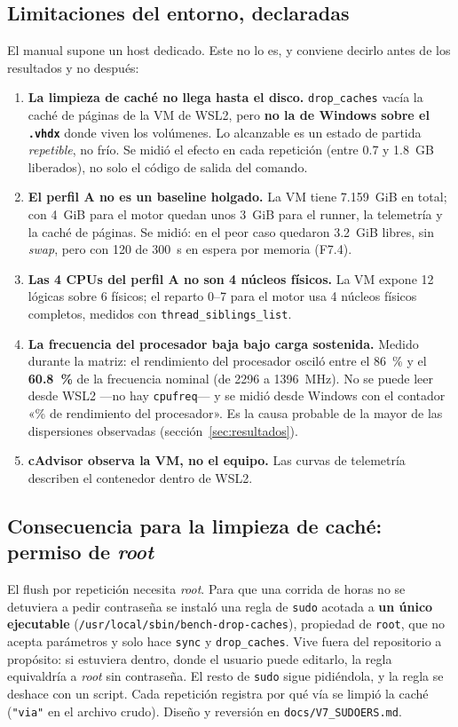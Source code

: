 \subsection{Limitaciones del entorno, declaradas}
\label{sec:limitaciones-entorno}

El manual supone un host dedicado. Este no lo es, y conviene decirlo antes de los
resultados y no después:

\begin{enumerate}
  \item \textbf{La limpieza de caché no llega hasta el disco.}
        \texttt{drop\_caches} vacía la caché de páginas de la VM de WSL2, pero
        \textbf{no la de Windows sobre el \texttt{.vhdx}} donde viven los
        volúmenes. Lo alcanzable es un estado de partida \emph{repetible}, no
        frío. Se midió el efecto en cada repetición (entre 0.7 y 1.8~GB
        liberados), no solo el código de salida del comando.
  \item \textbf{El perfil A no es un baseline holgado.} La VM tiene 7.159~GiB en
        total; con 4~GiB para el motor quedan unos 3~GiB para el runner, la
        telemetría y la caché de páginas. Se midió: en el peor caso quedaron
        3.2~GiB libres, sin \emph{swap}, pero con 120 de 300~s en espera por
        memoria (F7.4).
  \item \textbf{Las 4 CPUs del perfil A no son 4 núcleos físicos.} La VM expone 12
        lógicas sobre 6 físicos; el reparto 0--7 para el motor usa 4 núcleos
        físicos completos, medidos con \texttt{thread\_siblings\_list}.
  \item \textbf{La frecuencia del procesador baja bajo carga sostenida.} Medido
        durante la matriz: el rendimiento del procesador osciló entre el 86~\% y
        el \textbf{60.8~\%} de la frecuencia nominal (de 2296 a 1396~MHz). No se
        puede leer desde WSL2 —no hay \texttt{cpufreq}— y se midió desde Windows
        con el contador «\% de rendimiento del procesador». Es la causa probable
        de la mayor de las dispersiones observadas (sección~\ref{sec:resultados}).
  \item \textbf{cAdvisor observa la VM, no el equipo.} Las curvas de telemetría
        describen el contenedor dentro de WSL2.
\end{enumerate}

\subsection{Consecuencia para la limpieza de caché: permiso de \emph{root}}

El flush por repetición necesita \emph{root}. Para que una corrida de horas no se
detuviera a pedir contraseña se instaló una regla de \texttt{sudo} acotada a
\textbf{un único ejecutable}
(\texttt{/usr/local/sbin/\allowbreak bench-drop-caches}),
propiedad de \texttt{root}, que no acepta parámetros y solo hace \texttt{sync} y
\texttt{drop\_caches}. Vive fuera del repositorio a propósito: si estuviera dentro,
donde el usuario puede editarlo, la regla equivaldría a \emph{root} sin
contraseña. El resto de \texttt{sudo} sigue pidiéndola, y la regla se deshace con
un script. Cada repetición registra por qué vía se limpió la caché
(\texttt{"via"} en el archivo crudo). Diseño y reversión en
\texttt{docs/V7\_SUDOERS.md}.
